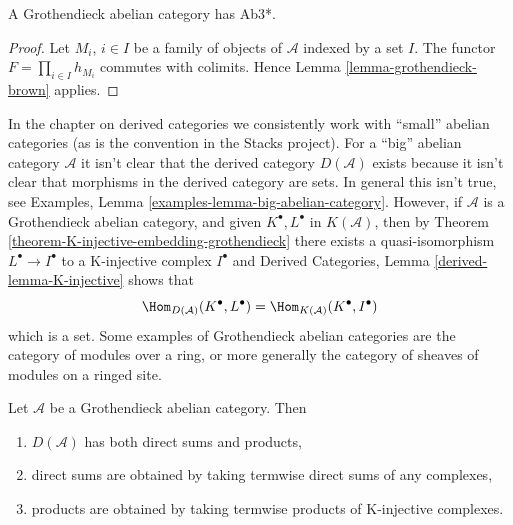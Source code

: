 \begin{lemma}
\label{lemma-grothendieck-products}
A Grothendieck abelian category has Ab3*.
\end{lemma}

\begin{proof}
Let $M_i$, $i \in I$ be a family of objects of $\mathcal{A}$ indexed
by a set $I$. The functor $F = \prod_{i \in I} h_{M_i}$
commutes with colimits. Hence
Lemma \ref{lemma-grothendieck-brown}
applies.
\end{proof}

\begin{remark}
\label{remark-existence-D}
In the chapter on derived categories we consistently work with
``small'' abelian categories (as is the convention in the Stacks
project). For a ``big'' abelian category $\mathcal{A}$ it isn't clear
that the derived category $D(\mathcal{A})$ exists because it isn't
clear that morphisms in the derived category are sets. In general this
isn't true, see
Examples, Lemma \ref{examples-lemma-big-abelian-category}.
However, if $\mathcal{A}$ is a Grothendieck abelian category, and given
$K^\bullet, L^\bullet$ in $K(\mathcal{A})$, then by
Theorem \ref{theorem-K-injective-embedding-grothendieck}
there exists a quasi-isomorphism $L^\bullet \to I^\bullet$ to a
K-injective complex $I^\bullet$ and
Derived Categories, Lemma \ref{derived-lemma-K-injective} shows that
$$
\Hom_{D(\mathcal{A})}(K^\bullet, L^\bullet) =
\Hom_{K(\mathcal{A})}(K^\bullet, I^\bullet)
$$
which is a set. Some examples of Grothendieck abelian categories
are the category of modules over a ring, or more generally
the category of sheaves of modules on a ringed site.
\end{remark}

\begin{lemma}
\label{lemma-derived-products}
Let $\mathcal{A}$ be a Grothendieck abelian category.
Then
\begin{enumerate}
\item $D(\mathcal{A})$ has both direct sums and products,
\item direct sums are obtained by taking termwise direct sums of
any complexes,
\item products are obtained by taking termwise products of
K-injective complexes.
\end{enumerate}
\end{lemma}


